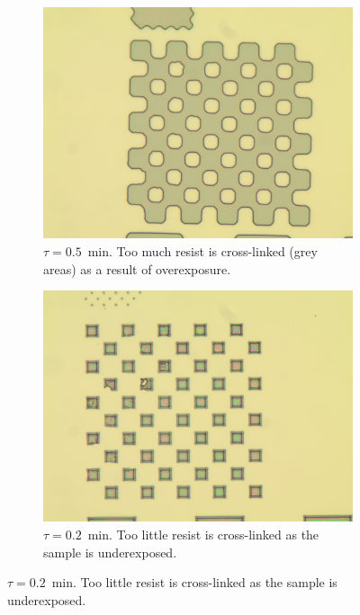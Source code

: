 \begin{figure}[!b]
    \centering
    \begin{subfigure}[t]{0.3\linewidth}
        \centering
        \includegraphics[width=\textwidth]{data/b2d1.jpg}
	    \caption{$\tau = 0.5$~min. Too much resist is cross-linked (grey areas) as a result of overexposure.}
	    \label{fig:b2d1}
    \end{subfigure}
    \hfill
    \begin{subfigure}[t]{0.3\linewidth}
        \centering
        \includegraphics[width=\textwidth]{data/b2h1.jpg}
	    \caption{$\tau = 0.2$~min. Too little resist is cross-linked as the sample is underexposed.}
	    \label{fig:b2h1}
    \end{subfigure}

\end{figure}
